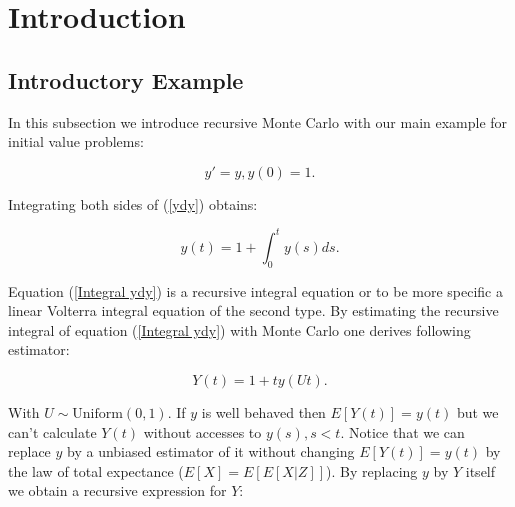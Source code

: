 \documentclass[a4paper,12pt]{article}
\begin{document}

\newpage
\tableofcontents
\newpage

\begin{abstract}
    We will write this at the end. Also need a dutch abstract
\end{abstract}

\section{Introduction}

\subsection{Introductory Example}
In this subsection we introduce recursive  Monte Carlo with our main example
for initial value problems:

\begin{equation} \label{ydy}
    y'=y, y(0)=1.
\end{equation}

Integrating both sides of (\ref{ydy}) obtains:

\begin{equation} \label{Integral ydy}
    y(t) = 1 + \int_{0}^{t} y(s) ds.
\end{equation}

Equation (\ref{Integral ydy}) is a recursive integral equation or to be more specific
a linear Volterra integral equation of the second type. By estimating the recursive integral
of equation (\ref{Integral ydy}) with Monte Carlo one derives following estimator:

\begin{equation}
    Y(t) = 1 + t y(Ut).
\end{equation}

With $U \sim \text{Uniform}(0,1)$. If $y$ is well behaved then $E[Y(t)]=y(t)$ but we can't
calculate $Y(t)$ without accesses to $y(s),s<t$. Notice that we can replace $y$ by a
unbiased estimator of it without changing $E[Y(t)]=y(t)$ by the law of total expectance
($E[X] = E[E[X|Z]]$). By replacing $y$ by $Y$ itself we obtain a recursive expression for $Y$:
\end{document}
